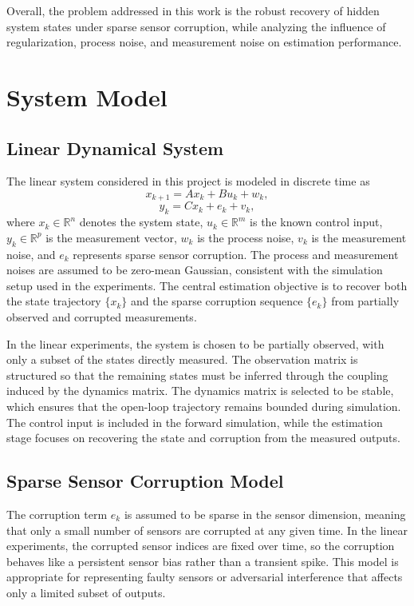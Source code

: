 \documentclass[conference]{IEEEtran}
\begin{document}
Overall, the problem addressed in this work is the robust recovery of hidden system states under sparse sensor corruption, while analyzing the influence of regularization, process noise, and measurement noise on estimation performance.

\section{System Model}

\subsection{Linear Dynamical System}

The linear system considered in this project is modeled in discrete time as
\begin{equation}
x_{k+1} = Ax_k + Bu_k + w_k,
\end{equation}
\begin{equation}
y_k = Cx_k + e_k + v_k,
\end{equation}
where $x_k \in \mathbb{R}^n$ denotes the system state, $u_k \in \mathbb{R}^m$ is the known control input, $y_k \in \mathbb{R}^p$ is the measurement vector, $w_k$ is the process noise, $v_k$ is the measurement noise, and $e_k$ represents sparse sensor corruption. The process and measurement noises are assumed to be zero-mean Gaussian, consistent with the simulation setup used in the experiments. The central estimation objective is to recover both the state trajectory $\{x_k\}$ and the sparse corruption sequence $\{e_k\}$ from partially observed and corrupted measurements. \cite{linearModel}

In the linear experiments, the system is chosen to be partially observed, with only a subset of the states directly measured. The observation matrix is structured so that the remaining states must be inferred through the coupling induced by the dynamics matrix. The dynamics matrix is selected to be stable, which ensures that the open-loop trajectory remains bounded during simulation. The control input is included in the forward simulation, while the estimation stage focuses on recovering the state and corruption from the measured outputs. \cite{linearModel}

\subsection{Sparse Sensor Corruption Model}

The corruption term $e_k$ is assumed to be sparse in the sensor dimension, meaning that only a small number of sensors are corrupted at any given time. In the linear experiments, the corrupted sensor indices are fixed over time, so the corruption behaves like a persistent sensor bias rather than a transient spike. This model is appropriate for representing faulty sensors or adversarial interference that affects only a limited subset of outputs. \cite{linearModel}
\end{document}
